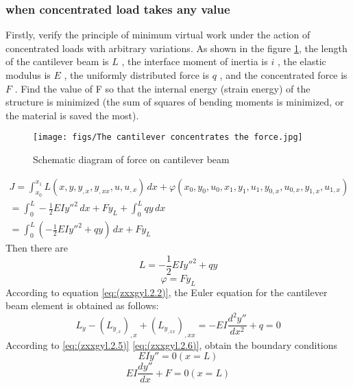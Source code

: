 \subsubsection {when concentrated load takes any value}
Firstly, verify the principle of minimum virtual work under the action of concentrated loads with arbitrary variations. As shown in the figure \ref{fig:jizhongli}, the length of the cantilever beam is $ L$  , the interface moment of inertia is $ i$  , the elastic modulus is $ E $ , the uniformly distributed force is $ q $ , and the concentrated force is $ F $ . Find the value of F so that the internal energy (strain energy) of the structure is minimized (the sum of squares of bending moments is minimized, or the material is saved the most).
\begin{figure}[h!] %
    \centering
    \texttt{[image: figs/The cantilever concentrates the force.jpg]} 
    \caption{Schematic diagram of force on cantilever beam}
    \label{fig:jizhongli}
\end{figure}
\begin{multline}\label{eq:(example.xbl.1)}
J = \int_{x_{0}}^{x_{1}} L(x,y,y_{,x},y_{,xx},u,u_{,x})\,dx+\varphi(x_{0},y_{0},u_{0},x_{1},y_{1},u_{1},y_{0,x},u_{0,x},y_{1,x},u_{1,x})\\
=\int_{0}^{L} -\frac{1} {2}EIy ''^2\,dx+Fy_{L}+\int_{0}^ {L}qy \,dx
\\=\int_{0}^{L} (-\frac{1} {2}EIy ''^2+qy)\,dx+Fy_{L}
\end{multline}
Then there are
\begin{equation} \label{eq:(example.xbl.2)}    
L=-\frac{1} {2}EIy ''^2+qy
\end{equation}
\begin{equation} \label{eq:(example.xbl.3)}    
\varphi=Fy_{L}\end{equation}
According to equation \ref{eq:(zxxgyl.2.2)}, the Euler equation for the cantilever beam element is obtained as follows:
\begin{equation}\label{eq:(example.xbl.4)}
L_{y} - \left(L_{y_{,x}}\right)_{,x}+\left(L_{y_{,xx}}\right)_{,xx}
=-EI\frac{d^2y''}{dx^2}+q=0
\end{equation}
According to \ref{eq:(zxxgyl.2.5)} \ref{eq:(zxxgyl.2.6)}, obtain the boundary conditions
\begin{equation}\label{eq:(example.xbl.5)}
EIy''=0 (x=L)
\end{equation}
\begin{equation}\label{eq:(example.xbl.6)}
EI\frac{dy''}{dx}+F=0 (x=L)
\end{equation}
